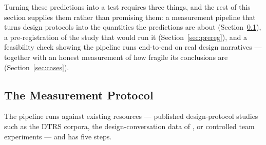 \documentclass[11pt]{article}
\begin{document}
\noindent Turning these predictions into a test requires three things, and the rest of this section supplies them rather than promising them: a measurement pipeline that turns design protocols into the quantities the predictions are about (Section~\ref{sec:protocol}), a pre-registration of the study that would run it (Section~\ref{sec:prereg}), and a feasibility check showing the pipeline runs end-to-end on real design narratives --- together with an honest measurement of how fragile its conclusions are (Section~\ref{sec:cases}).

\subsection{The Measurement Protocol}
\label{sec:protocol}

The pipeline runs against existing resources --- published design-protocol studies such as the DTRS corpora, the design-conversation data of \citet{menning2018}, or controlled team experiments --- and has five steps.
\end{document}

